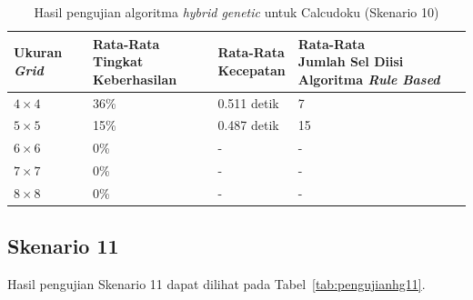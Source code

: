 \begin{table}
\centering
\captionsetup{justification=centering}
\caption[Hasil pengujian algoritma \textit{hybrid genetic} untuk Calcudoku (Skenario 10)]{Hasil pengujian algoritma \textit{hybrid genetic} untuk Calcudoku (Skenario 10)}
\begin{tabular}{| l | l | l | l |}
\hline
Ukuran \textit{Grid} & \makecell[l]{Rata-Rata \\ Tingkat Keberhasilan} & \makecell[l]{Rata-Rata \\ Kecepatan} & \makecell[l]{Rata-Rata \\ Jumlah Sel Diisi Algoritma \textit{Rule Based}} \\
\hline \hline
\begin{math}4 \times 4\end{math} & 36\% & 0.511 detik & 7 \\
\hline
\begin{math}5 \times 5\end{math} & 15\% & 0.487 detik & 15 \\
\hline
\begin{math}6 \times 6\end{math} & 0\% & - & - \\
\hline
\begin{math}7 \times 7\end{math} & 0\% & - & - \\
\hline
\begin{math}8 \times 8\end{math} & 0\% & - & - \\
\hline
\end{tabular}
\label{tab:pengujianhg10}
\end{table}

\clearpage

\subsection{Skenario 11}
\label{sec:skenario11}

Hasil pengujian Skenario 11 dapat dilihat pada Tabel~\ref{tab:pengujianhg11}.


